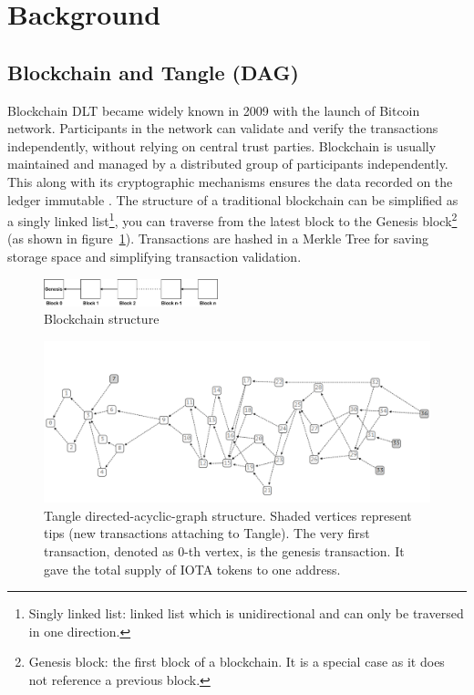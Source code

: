 \section{Background}
\label{sec:background}

\subsection{Blockchain and Tangle (DAG)}
Blockchain DLT became widely known in 2009 with the launch of Bitcoin network.
Participants in the network can validate and verify the transactions independently, without relying on central trust parties.
Blockchain is usually maintained and managed by a distributed group of participants independently.
This along with its cryptographic mechanisms ensures the data recorded on the ledger immutable \cite{Yaga2018BlockchainTO}.
The structure of a traditional blockchain can be simplified as a singly linked list\footnote{Singly linked list: linked list which is unidirectional and can only be traversed in one direction.},
you can traverse from the latest block to the Genesis block\footnote{Genesis block: the first block of a blockchain. It is a special case as it does not reference a previous block.} (as shown in figure~\ref{fig:blockchain_structure}).
Transactions are hashed in a Merkle Tree \cite{merkle1980protocols} for saving storage space and simplifying transaction validation.


\begin{figure}[h]
    \includegraphics[width=0.45\textwidth,trim={-2cm -1cm 0 -1cm},clip]{figs/blockchain_structure.pdf}
    \caption{Blockchain structure}
    \label{fig:blockchain_structure}
\end{figure}

\begin{figure}[t]
    \centering
    \includegraphics[width=\textwidth,trim={-1cm 0 0 2cm},clip]{figs/tangle_structure.png}
    \caption{Tangle directed-acyclic-graph structure. Shaded vertices represent tips (new transactions attaching to Tangle). The very first transaction, denoted as 0-th vertex, is the genesis transaction. It gave the total supply of IOTA tokens to one address.}
    \label{fig:tangle_structure}
\end{figure}

